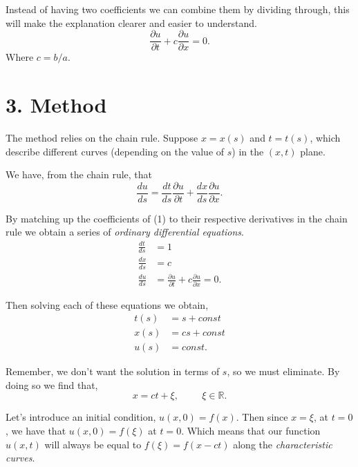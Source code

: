 \documentclass[11pt]{article}
\begin{document}
Instead of having two coefficients we can combine them by dividing through, this will make the explanation clearer and easier to understand.
\begin{equation}
    \frac{\partial u}{\partial t} + c \frac{\partial u}{\partial x} = 0.
\end{equation}
Where $c = b/a$.

\newpage

\section*{3. Method}
The method relies on the chain rule. Suppose $x = x(s)$ and $t = t(s)$, which describe different curves (depending on the value of $s$) in the $(x,t)$ plane. 

We have, from the chain rule, that
\begin{equation}
    \frac{du}{ds} = \frac{dt}{ds} \frac{\partial u}{\partial t} + \frac{dx}{ds} \frac{\partial u}{\partial x}.
\end{equation}

By matching up the coefficients of (1) to their respective derivatives in the chain rule we obtain a series of \textit{ordinary differential equations}.
\begin{align}
    \frac{dt}{ds} &= 1 \\
    \frac{dx}{ds} &= c \\
    \frac{du}{ds} &= \frac{\partial u}{\partial t} + c \frac{\partial u}{\partial x} = 0.
\end{align}

Then solving each of these equations we obtain,
\begin{align}
    t(s) &= s + const \\
    x(s) &= cs + const \\
    u(s) &= const.
\end{align}

Remember, we don't want the solution in terms of $s$, so we must eliminate. By doing so we find that,
\begin{equation}
    x = ct + \xi, \hspace{1cm} \xi \in \mathbb{R}.
\end{equation}

Let's introduce an initial condition, $ u(x,0) = f(x)$. Then since $x=\xi$, at $t=0$, we have that $u(x,0) = f(\xi)$ at $t=0$. Which means that our function $u(x,t)$ will always be equal to $f(\xi) = f(x-ct)$ along the \textit{characteristic curves}. 
\end{document}
